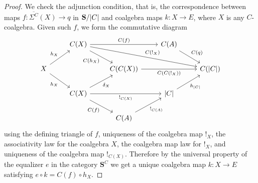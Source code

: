 \documentclass[11pt, oneside, article]{memoir}
\theoremstyle{plain}
\theoremstyle{definition}
\theoremstyle{remark}
\DeclarePairedDelimiter{\abs}{\lvert}{\rvert}
\newcommand{\bang}{\mathrm{!}}
\newcommand{\cat}[1]{\mathbf{#1}}
\newcommand{\CoalgOn}[2]{{#2}^{#1}}
\newcommand{\CoalgS}[1]{\CoalgOn{#1}{\bS}}
\newcommand{\pts}[1]{{\abs{#1}}}
\newcommand{\ptlift}[1]{\overline{#1}}
\newcommand{\carr}{\Sigma}
\newcommand{\car}[1]{\carr^{#1}}
\newcommand{\carC}{\car{\cC}}
\newcommand{\cmnd}[1]{{#1}}
\newcommand{\eE}{E}
\newcommand{\eX}{X}
\newcommand{\xA}{A}
\newcommand{\hK}{k}
\newcommand{\hH}{h}
\newcommand{\cC}{\cmnd{C}}
\newcommand{\bS}{\cat{S}}
\newcommand{\CS}{\CoalgS{\cC}}
\begin{document}
\begin{proof}
  We check the adjunction condition, that is, the correspondence
  between maps $f\colon \ptlift{\carC}(\eX)\to q$ in $\bS/\pts{\cC}$
  and coalgebra maps $\hK\colon \eX\to \eE$, where $\eX$ is any
  $\cC$-coalgebra. Given such $f$, we form the commutative diagram
  \[
    \begin{tikzcd}
      & {\cC(\eX)} && {\cC(\xA)} & \\
      \eX && {\cC (\cC(\eX))} && {\cC(\pts{\cC})} \\
      & {\cC(\eX)} && {\pts{\cC}} \\
      && {\cC(\xA)}
      \arrow["{{\cC(f)}}", from=1-2, to=1-4]
      \arrow["{{\cC(\hH_\eX)}}"', from=1-2, to=2-3]
      \arrow["{{\cC(\bang_\eX)}}", from=1-2, to=2-5]
      \arrow["{{\cC(q)}}", from=1-4, to=2-5]
      \arrow["{{\hH_\eX}}", from=2-1, to=1-2]
      \arrow["{{\hH_\eX}}"', from=2-1, to=3-2]
      \arrow["{{\cC (\cC(\bang_\eX))}}"', from=2-3, to=2-5]
      \arrow["{{\delta_\eX}}"', from=3-2, to=2-3]
      \arrow["{{\bang_{\cC(\eX)}}}"', from=3-2, to=3-4]
      \arrow["{{\cC(f)}}"', from=3-2, to=4-3]
      \arrow["{{\hH_{\pts{\cC}}}}"', from=3-4, to=2-5]
      \arrow["{{\bang_{\cC(\xA)}}}"', from=4-3, to=3-4]
    \end{tikzcd}
  \]
  using the defining triangle of $f$, uniqueness of the coalgebra map
  $\bang_\eX$, the associativity law for the
  coalgebra $\eX$, the
  coalgebra map law for $\bang_\eX$, and uniqueness of the coalgebra map $\bang_{\cC(\eX)}$.
  Therefore by the universal property of
  the equalizer $e$ in the category $\CS$ we get a unique coalgebra
  map $\hK\colon \eX\to \eE$ satisfying
  $e \circ \hK =\cC(f)\circ \hH_\eX$.


\end{proof}
\end{document}

